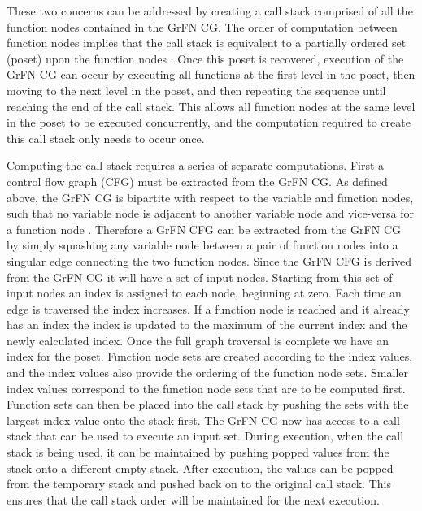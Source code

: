 These two concerns can be addressed by creating a call stack comprised of all the function nodes contained in the GrFN CG.
The order of computation between function nodes implies that the call stack is equivalent to a partially ordered set (poset) upon the function nodes \citep{simovici2008miningTools}.
Once this poset is recovered, execution of the GrFN CG can occur by executing all functions at the first level in the poset, then moving to the next level in the poset, and then repeating the sequence until reaching the end of the call stack.
This allows all function nodes at the same level in the poset to be executed concurrently, and the computation required to create this call stack only needs to occur once.

Computing the call stack requires a series of separate computations.
First a control flow graph (CFG) \citep{allen1970CFG} must be extracted from the GrFN CG.
As defined above, the GrFN CG is bipartite with respect to the variable and function nodes, such that no variable node is adjacent to another variable node and vice-versa for a function node \citep{bondy1976graph}.
Therefore a GrFN CFG can be extracted from the GrFN CG by simply squashing any variable node between a pair of function nodes into a singular edge connecting the two function nodes.
Since the GrFN CFG is derived from the GrFN CG it will have a set of input nodes.
Starting from this set of input nodes an index is assigned to each node, beginning at zero.
Each time an edge is traversed the index increases.
If a function node is reached and it already has an index the index is updated to the maximum of the current index and the newly calculated index.
Once the full graph traversal is complete we have an index for the poset.
Function node sets are created according to the index values, and the index values also provide the ordering of the function node sets.
Smaller index values correspond to the function node sets that are to be computed first.
Function sets can then be placed into the call stack by pushing the sets with the largest index value onto the stack first.
The GrFN CG now has access to a call stack that can be used to execute an input set.
During execution, when the call stack is being used, it can be maintained by pushing popped values from the stack onto a different empty stack.
After execution, the values can be popped from the temporary stack and pushed back on to the original call stack. This ensures that the call stack order will be maintained for the next execution.


